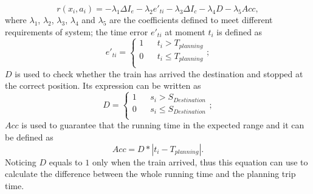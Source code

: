 \documentclass[journal]{IEEEtran}
\begin{document}
\begin{itemize}
	\begin{equation}
	r(x_i, a_i) =  -\lambda_1 \Delta I_e - \lambda_2 e'_{ti} - \lambda_3 \Delta I_c - \lambda_4 D - \lambda_5 Acc,
	\end{equation}	
	where $\lambda_1$, $\lambda_2$, $\lambda_3$, $\lambda_4$ and $\lambda_5$ are the coefficients defined to meet different requirements of system; the time error \(e'_{ti}\) at moment \(t_i\) is defined as
	\begin{equation}
    e'_{ti}=\left\{
    \begin{array}{rcl}
    1 & & t_i > T_{planning}\\
    0 & & t_i \leq T_{planning}\\
    \end{array} 
    \right.;
    \end{equation}
    $D$ is used to check whether the train has arrived the destination and stopped at the correct position. Its expression can be written as
    \begin{equation}
    D = \left\{
    \begin{array}{rcl}
    1 & & s_i > S_{Destination}\\
    0 & & s_i \leq S_{Destination}\\
    \end{array} 
    \right.;
    \end{equation}
    $Acc$ is used to guarantee that the running time in the expected range and it can be defined as
    \begin{equation}
    Acc = D * |t_i - T_{planning}|.
    \end{equation}
    Noticing $D$ equals to $1$ only when the train arrived, thus this equation can use to calculate the difference between the whole running time and the planning trip time.
\end{itemize}
\end{document}
